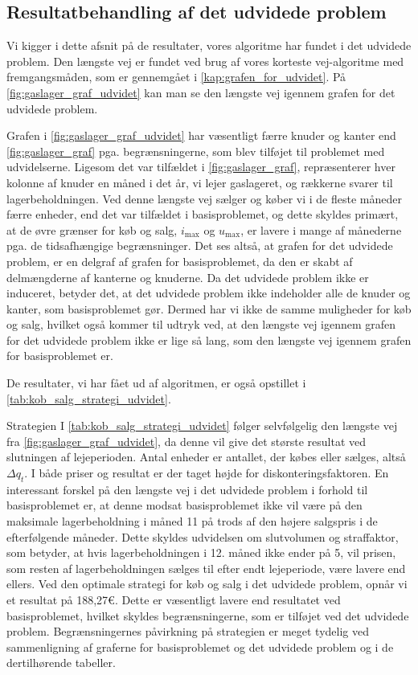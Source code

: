 \subsection{Resultatbehandling af det udvidede problem} \label{kap:resultat_udvidet}

Vi kigger i dette afsnit på de resultater, vores algoritme har fundet i det udvidede problem. Den længste vej er fundet ved brug af vores korteste vej-algoritme med fremgangsmåden, som er gennemgået i \autoref{kap:grafen_for_udvidet}. På \autoref{fig:gaslager_graf_udvidet} kan man se den længste vej igennem grafen for det udvidede problem.

Grafen i \autoref{fig:gaslager_graf_udvidet} har væsentligt færre knuder og kanter end \autoref{fig:gaslager_graf} pga. begrænsningerne, som blev tilføjet til problemet med udvidelserne. Ligesom det var tilfældet i \autoref{fig:gaslager_graf}, repræsenterer hver kolonne af knuder en måned i det år, vi lejer gaslageret, og rækkerne svarer til lagerbeholdningen. Ved denne længste vej sælger og køber vi i de fleste måneder færre enheder, end det var tilfældet i basisproblemet, og dette skyldes primært, at de øvre grænser for køb og salg, $i_{\max}$ og $u_{\max}$, er lavere i mange af månederne pga. de tidsafhængige begrænsninger. Det ses altså, at grafen for det udvidede problem, er en delgraf af grafen for basisproblemet, da den er skabt af delmængderne af kanterne og knuderne. Da det udvidede problem ikke er induceret, betyder det, at det udvidede problem ikke indeholder alle de knuder og kanter, som basisproblemet gør. Dermed har vi ikke de samme muligheder for køb og salg, hvilket også kommer til udtryk ved, at den længste vej igennem grafen for det udvidede problem ikke er lige så lang, som den længste vej igennem grafen for basisproblemet er.

De resultater, vi har fået ud af algoritmen, er også opstillet i \autoref{tab:kob_salg_strategi_udvidet}. 

Strategien I \autoref{tab:kob_salg_strategi_udvidet} følger selvfølgelig den længste vej fra \autoref{fig:gaslager_graf_udvidet}, da denne vil give det største resultat ved slutningen af lejeperioden. Antal enheder er antallet, der købes eller sælges, altså $\Delta q_t$. I både priser og resultat er der taget højde for diskonteringsfaktoren. En interessant forskel på den længste vej i det udvidede problem i forhold til basisproblemet er, at denne modsat basisproblemet ikke vil være på den maksimale lagerbeholdning i måned 11 på trods af den højere salgspris i de efterfølgende måneder. Dette skyldes udvidelsen om slutvolumen og straffaktor, som betyder, at hvis lagerbeholdningen i 12. måned ikke ender på 5, vil prisen, som resten af lagerbeholdningen sælges til efter endt lejeperiode, være lavere end ellers. 
Ved den optimale strategi for køb og salg i det udvidede problem, opnår vi et resultat på 188,27€. Dette er væsentligt lavere end resultatet ved basisproblemet, hvilket skyldes begrænsningerne, som er tilføjet ved det udvidede problem. Begrænsningernes påvirkning på strategien er meget tydelig ved sammenligning af graferne for basisproblemet og det udvidede problem og i de dertilhørende tabeller. 
